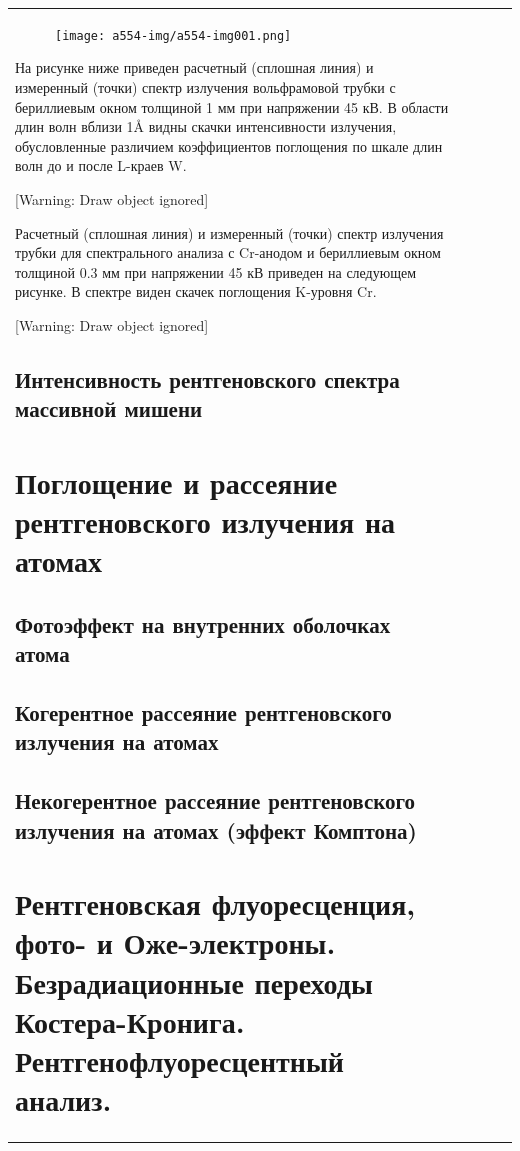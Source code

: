 \documentclass[a4paper,14pt, openany, twoside, draft]{extbook} %
\begin{document}
\begin{flushleft}
\begin{supertabular}{|m{1.7279999cm}|m{1.522cm}|m{1.522cm}|m{1.522cm}|m{1.744cm}|}
\begin{figure}
\centering
\texttt{[image: a554-img/a554-img001.png]}
\end{figure}
На рисунке ниже приведен расчетный (сплошная линия) и измеренный (точки) спектр излучения вольфрамовой трубки с бериллиевым окном толщиной 1 мм при напряжении 45 кВ. В области длин волн вблизи 1Å видны скачки интенсивности излучения, обусловленные различием коэффициентов поглощения по шкале длин волн до и после L{}-краев W.

[Warning: Draw object ignored]

Расчетный (сплошная линия) и измеренный (точки) спектр излучения трубки для спектрального анализа с Cr{}-анодом и бериллиевым окном толщиной 0.3 мм при напряжении 45 кВ приведен на следующем рисунке. В спектре виден скачек поглощения K{}-уровня Cr.

[Warning: Draw object ignored]


\section{Интенсивность рентгеновского спектра массивной мишени}

\chapter{Поглощение и рассеяние рентгеновского излучения на атомах}
\label{cha:absorbtion}

\section{Фотоэффект на внутренних оболочках атома}
\section{Когерентное рассеяние рентгеновского излучения на атомах}
\section{Некогерентное рассеяние рентгеновского излучения на атомах (эффект Комптона)}

\chapter{Рентгеновская флуоресценция, фото- и Оже-электроны. Безрадиационные переходы Костера-Кронига. Рентгенофлуоресцентный анализ.}
\label{cha:xray-analisys}


\end{supertabular}
\end{flushleft}
\end{document}
